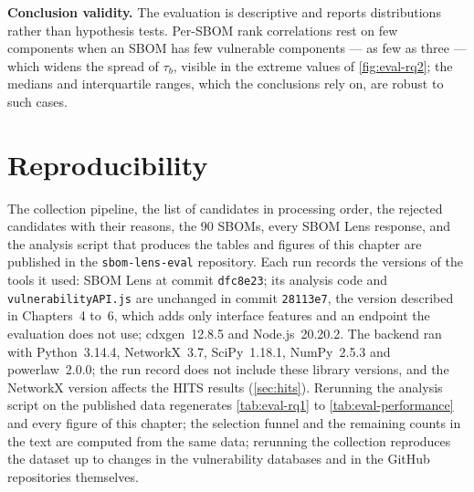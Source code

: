 \textbf{Conclusion validity.} The evaluation is descriptive and reports distributions rather than hypothesis tests. Per-SBOM rank correlations rest on few components when an SBOM has few vulnerable components --- as few as three --- which widens the spread of \(\tau_b\), visible in the extreme values of \autoref{fig:eval-rq2}; the medians and interquartile ranges, which the conclusions rely on, are robust to such cases.


\section{Reproducibility}
\label{sec:eval-reproducibility}

The collection pipeline, the list of candidates in processing order, the rejected candidates with their reasons, the 90 SBOMs, every SBOM Lens response, and the analysis script that produces the tables and figures of this chapter are published in the \texttt{sbom-lens-eval} repository. Each run records the versions of the tools it used: SBOM Lens at commit \texttt{dfc8e23}; its analysis code and \texttt{vulnerabilityAPI.js} are unchanged in commit \texttt{28113e7}, the version described in Chapters~4 to~6, which adds only interface features and an endpoint the evaluation does not use; cdxgen~12.8.5 and Node.js~20.20.2. The backend ran with Python~3.14.4, NetworkX~3.7, SciPy~1.18.1, NumPy~2.5.3 and powerlaw~2.0.0; the run record does not include these library versions, and the NetworkX version affects the HITS results (\autoref{sec:hits}). Rerunning the analysis script on the published data regenerates \autoref{tab:eval-rq1} to \autoref{tab:eval-performance} and every figure of this chapter; the selection funnel and the remaining counts in the text are computed from the same data; rerunning the collection reproduces the dataset up to changes in the vulnerability databases and in the GitHub repositories themselves.
